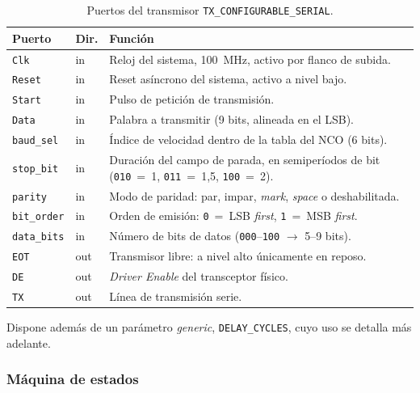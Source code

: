 \begin{table}[H]
    \centering
    \begin{tabular}{llp{}}
        \hline
        \textbf{Puerto} & \textbf{Dir.} & \textbf{Función} \\
        \hline
        \texttt{Clk}       & in  & Reloj del sistema, 100~MHz, activo por flanco de subida. \\
        \texttt{Reset}     & in  & Reset asíncrono del sistema, activo a nivel bajo. \\
        \texttt{Start}     & in  & Pulso de petición de transmisión. \\
        \texttt{Data}      & in  & Palabra a transmitir (9 bits, alineada en el LSB). \\
        \texttt{baud\_sel} & in  & Índice de velocidad dentro de la tabla del NCO (6 bits). \\
        \texttt{stop\_bit} & in  & Duración del campo de parada, en semiperíodos de bit
                                   (\texttt{010}~=~1, \texttt{011}~=~1,5, \texttt{100}~=~2). \\
        \texttt{parity}    & in  & Modo de paridad: par, impar, \textit{mark}, \textit{space}
                                   o deshabilitada. \\
        \texttt{bit\_order}& in  & Orden de emisión: \texttt{0}~=~LSB \textit{first},
                                   \texttt{1}~=~MSB \textit{first}. \\
        \texttt{data\_bits}& in  & Número de bits de datos (\texttt{000}--\texttt{100}
                                   $\rightarrow$ 5--9 bits). \\
        \texttt{EOT}       & out & Transmisor libre: a nivel alto únicamente en reposo. \\
        \texttt{DE}        & out & \textit{Driver Enable} del transceptor físico. \\
        \texttt{TX}        & out & Línea de transmisión serie. \\
        \hline
    \end{tabular}
    \caption{Puertos del transmisor \texttt{TX\_CONFIGURABLE\_SERIAL}.}
    \label{tab:tx_puertos}
\end{table}

Dispone además de un parámetro \textit{generic}, \texttt{DELAY\_CYCLES}, cuyo uso se detalla más
adelante.

\subsubsection{Máquina de estados}

